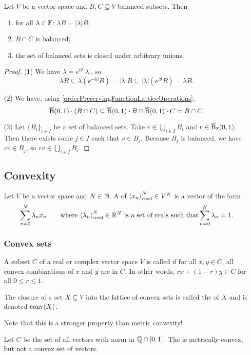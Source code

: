 \begin{lemma} \label{balancedLemma}
Let $V$ be a vector space and $B,C\subseteq V$ balanced subsets. Then
\begin{enumerate}
\item for all $\lambda\in \mathbb{F}$: $\lambda B = |\lambda| B$;
\item $B\cap C$ is balanced;
\item the set of balanced sets is closed under arbitrary unions.
\end{enumerate}
\end{lemma}
\begin{proof}
(1) We have $\lambda = e^{i\theta}|\lambda|$, so 
\[ \lambda B \subseteq \lambda (e^{-i\theta}B) = |\lambda|B \subseteq |\lambda| (e^{i\theta}B) = \lambda B. \]

(2) We have, using \ref{orderPreservingFunctionLatticeOperations},
\[ \operatorname{\overline{B}}(0,1)\cdot (B\cap C) \subseteq \operatorname{\overline{B}}(0,1)\cdot B \cap \operatorname{\overline{B}}(0,1)\cdot C = B\cap C. \]

(3) Let $\{B_i\}_{i\in I}$ be a set of balanced sets. Take $v\in \bigcup_{i\in I}B_i$ and $r\in \operatorname{\overline{B}}_{\mathbb{F}}(0,1)$. Then there exists some $j\in I$ such that $v\in B_j$. Because $B_j$ is balanced, we have $rv\in B_j$, so $rv\in \bigcup_{i\in I}B_i$.
\end{proof}



\subsection{Convexity}
\begin{definition}
Let $V$ be a vector space and $N\in \mathbb{N}$. A  of $\left\langle x_n \right\rangle_{n=0}^N \in V^N$ is a vector of the form
\[ \sum_{n=0}^N \lambda_n x_n \qquad \text{where $\left\langle \lambda_n \right\rangle_{n=0}^N \in \mathbb{R}^N$ is a set of reals such that} \sum_{n=0}^N \lambda_n = 1. \]
\end{definition}

\subsubsection{Convex sets}
\begin{definition}
A subset $C$ of a real or complex vector space $V$ is called  if for all $x,y\in C$, all convex combinations of $x$ and $y$ are in $C$. In other words, $rx + (1-r)y\in C$ for all $0\leq r \leq 1$.

The closure of a set $X\subseteq V$ into the lattice of convex sets is called the  of $X$ and is denoted $\operatorname{conv}(X)$.
\end{definition}
Note that this is a stronger property than metric convexity!
\begin{example}
Let $C$ be the set of all vectors with norm in $\mathbb{Q}\cap [0,1]$. The is metrically convex, but not a convex set of vectors.
\end{example}

